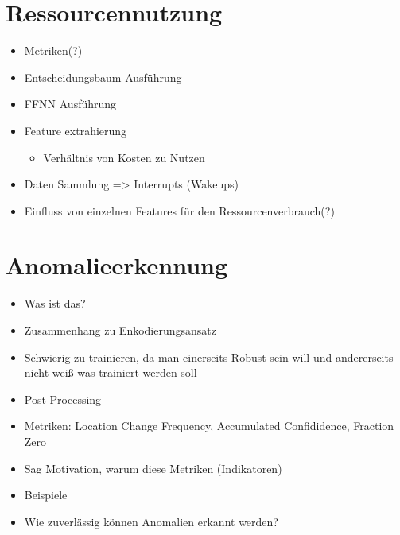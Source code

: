 \section{Ressourcennutzung}
\begin{itemize}
    \item Metriken(?)
    \item Entscheidungsbaum Ausführung
    \item FFNN Ausführung
    \item Feature extrahierung
    \begin{itemize}
        \item Verhältnis von Kosten zu Nutzen
    \end{itemize}
    \item Daten Sammlung => Interrupts (Wakeups)
    \item Einfluss von einzelnen Features für den Ressourcenverbrauch(?)
\end{itemize}

\section{Anomalieerkennung}
\begin{itemize}
    \item Was ist das?
    \item Zusammenhang zu Enkodierungsansatz
    \item Schwierig zu trainieren, da man einerseits Robust sein will und andererseits nicht weiß was trainiert werden soll
    \item Post Processing
    \item Metriken: Location Change Frequency, Accumulated Confididence, Fraction Zero
    \item Sag Motivation, warum diese Metriken (Indikatoren)
    \item Beispiele
    \item Wie zuverlässig können Anomalien erkannt werden?
\end{itemize}